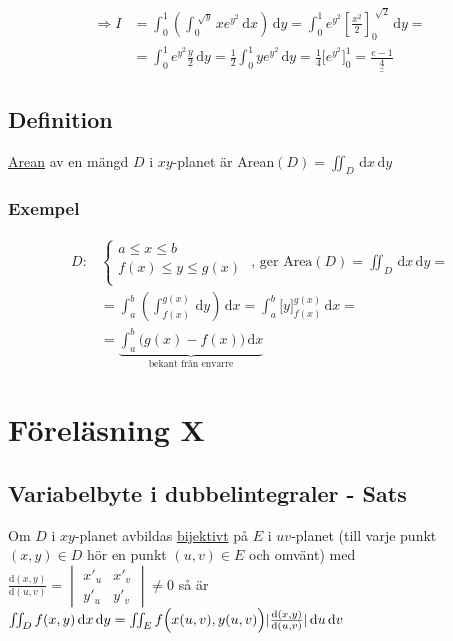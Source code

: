 \documentclass[a4paper]{article}
\newcommand{\svar}[1]{\underline{\underline{#1}}}
\DeclarePairedDelimiter \abs{\lvert}{\rvert}
\let\oldsqrt\sqrt
\renewcommand*{\sqrt}[2][\ ]{\oldsqrt[#1]{#2} }
\begin{document}
\begin{align*}
	\Rightarrow I &= \int_0^1 \left( \int_0^{\sqrt{y}} xe^{y^2} \,\mathrm{d}x \right) \,\mathrm{d}y = \int_0^1 e^{y^2} \left[\frac{x^2}{2}\right]_0^{\sqrt{2}} \,\mathrm{d}y = \\
	              &= \int_0^1 e^{y^2} \frac{y}{2} \,\mathrm{d}y = \frac{1}{2} \int_0^1 ye^{y^2} \,\mathrm{d}y = \frac{1}{4} \Bigg[ e^{y^2} \Bigg]_0^1 = \svar{\frac{e-1}{4}}
\end{align*}

\newpage
\subsection{Definition}
\underline{Arean} av en mängd $D$ i $xy$-planet är Arean$(D) = \iint_D \,\mathrm{d}x\,\mathrm{d}y$ \label{subsec:Area}

\subsubsection{Exempel}

\begin{align*}
	D: &
	\begin{cases}
	a \leq x \leq b \\
	f(x) \leq y \leq g(x) \\
	\end{cases}
\text{   , ger Area}(D) = \iint_D \,\mathrm{d}x\,\mathrm{d}y = \\
&= \int_a^b \left( \int_{f(x)}^{g(x)} \,\mathrm{d}y \right) \,\mathrm{d}x = \int_a^b \Bigg[ y \Bigg]_{f(x)}^{g(x)} \,\mathrm{d}x = \\
&= \underbrace{\int_a^b \Big(g(x) - f(x) \Big) \,\mathrm{d}x}_{\text{bekant från envarre}}
\end{align*}







\newpage
\section{Föreläsning X}
\subsection{Variabelbyte i dubbelintegraler - Sats}
Om $D$ i $xy$-planet avbildas \underline{bijektivt} på $E$ i $uv$-planet (till varje punkt $(x,y) \in D$ hör en punkt $(u,v) \in E$ och omvänt) med \(\frac{\mathrm{d}(x,y)}{\mathrm{d}(u,v)} =
\begin{vmatrix}
	x'_u & x'_v \\
	y'_u & y'_v
\end{vmatrix} \neq 0\)
så är $\iint_D f(x,y) \,\mathrm{d}x\,\mathrm{d}y = \iint_E f\Big( x(u,v),y(u,v) \Big)\abs{\frac{\mathrm{d}(x,y)}{\mathrm{d}(u,v)}}\,\mathrm{d}u\,\mathrm{d}v$
\end{document}
